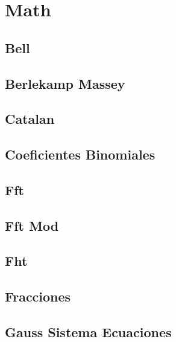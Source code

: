 \documentclass[10pt,landscape,twocolumn,a4paper,notitlepage]{article}
\newcommand\cppfile[2][]{

}
\begin{document}
\newpage


\section{Math}

\subsection{Bell}
\cppfile{math/bell.cpp}

\subsection{Berlekamp Massey}
\cppfile{math/berlekamp_massey.cpp}

\subsection{Catalan}
\cppfile{math/catalan.cpp}

\subsection{Coeficientes Binomiales}
\cppfile{math/coeficientes_binomiales.cpp}

\subsection{Fft}
\cppfile{math/fft.cpp}

\subsection{Fft Mod}
\cppfile{math/fft_mod.cpp}

\subsection{Fht}
\cppfile{math/fht.cpp}

\subsection{Fracciones}
\cppfile{math/fracciones.cpp}

\subsection{Gauss Sistema Ecuaciones}
\cppfile{math/gauss_sistema_ecuaciones.cpp}
\end{document}

